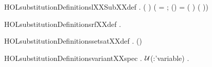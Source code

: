 \begin{SaveVerbatim}{HOLsubstitutionDefinitionslXXSubXXdef}
   \HOLSymConst{\HOLTokenForall{}}  .
       (  ) \HOLSymConst{=}
     (
         =   ;
        (\HOLSymConst{,}) = (   \HOLSymConst{,}   )
          (  ))
\end{SaveVerbatim}
\newcommand{\HOLsubstitutionDefinitionslXXSubXXdef}{\UseVerbatim{HOLsubstitutionDefinitionslXXSubXXdef}}
\begin{SaveVerbatim}{HOLsubstitutionDefinitionsrfXXdef}
\HOLTokenTurnstile{} \HOLSymConst{\HOLTokenForall{}}  .
         \HOLSymConst{=}   \HOLConst{\HOLTokenIn{}}         
\end{SaveVerbatim}
\newcommand{\HOLsubstitutionDefinitionsrfXXdef}{\UseVerbatim{HOLsubstitutionDefinitionsrfXXdef}}
\begin{SaveVerbatim}{HOLsubstitutionDefinitionssetsatXXdef}
\HOLTokenTurnstile{} \HOLSymConst{\HOLTokenForall{}}  .     \HOLSymConst{=} \HOLTokenLeftbrace{} \HOLTokenBar{} (\HOLSymConst{,}\HOLSymConst{,})  \HOLTokenRightbrace{}
\end{SaveVerbatim}
\newcommand{\HOLsubstitutionDefinitionssetsatXXdef}{\UseVerbatim{HOLsubstitutionDefinitionssetsatXXdef}}
\begin{SaveVerbatim}{HOLsubstitutionDefinitionsvariantXXspec}
\HOLTokenTurnstile{} \HOLSymConst{\HOLTokenForall{}}.
      \ensuremath{\cal{U}}(:'variable) \HOLSymConst{\HOLTokenImp{}}
       \HOLSymConst{\HOLTokenImp{}}
     \HOLSymConst{\HOLTokenForall{}}.    \HOLConst{\HOLTokenNotIn{}} 
\end{SaveVerbatim}
